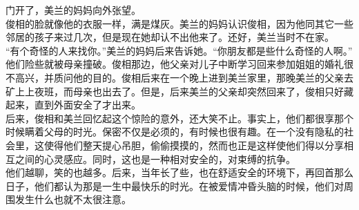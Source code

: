 门开了，美兰的妈妈向外张望。\\

俊相的脸就像他的衣服一样，满是煤灰。美兰的妈妈认识俊相，因为他同其它一些邻居的孩子来过几次，但是现在她却认不出他来了。还好，美兰当时不在家。\\

“有个奇怪的人来找你。”美兰的妈妈后来告诉她。“你朋友都是些什么奇怪的人啊。”\\

他们险些就被母亲撞破。俊相那边，他父亲对儿子中断学习回来参加姐姐的婚礼很不高兴，并质问他的目的。俊相后来在一个晚上进到美兰家里，那晚美兰的父亲去矿上上夜班，而母亲也出去了。但是，后来美兰的父亲却突然回来了，俊相只好藏起来，直到外面安全了才出来。\\

后来，俊相和美兰回忆起这个惊险的意外，还大笑不止。事实上，他们都很享那个时候瞒着父母的时光。保密不仅是必须的，有时候也很有趣。在一个没有隐私的社会里，这使得他们整天提心吊胆，偷偷摸摸的，然而也正是这样使他们得以分享相互之间的心灵感应。同时，这也是一种相对安全的，对束缚的抗争。\\

他们越聊，笑的也越多。后来，当年长了些，也在舒适安全的环境下，再回首那么日子，他们都认为那是一生中最快乐的时光。在被爱情冲昏头脑的时候，他们对周围发生什么也就不太很注意。\\
